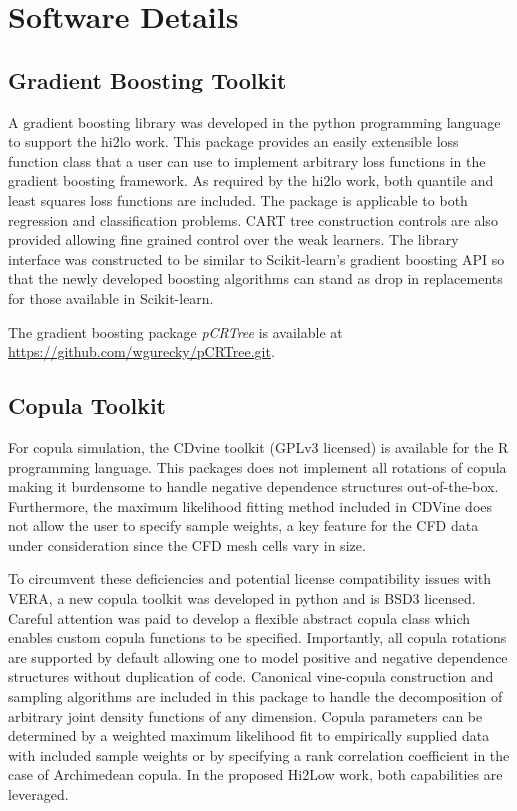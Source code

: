 
\section{Software Details}

\subsection{Gradient Boosting Toolkit}

A gradient boosting library was developed in the python programming language to support the hi2lo work.  This package provides an easily extensible loss function class that a user can use to implement arbitrary loss functions in the gradient boosting framework.  As required by the hi2lo work, both quantile and least squares loss functions are included.  The package is applicable to both regression and classification problems.  CART tree construction controls are also provided allowing fine grained control over the weak learners.
The library interface was constructed to be similar to Scikit-learn's gradient boosting API so that the newly developed boosting algorithms can stand as drop in replacements for those available in Scikit-learn.

The gradient boosting package \emph{pCRTree} is available at \url{https://github.com/wgurecky/pCRTree.git}.

\subsection{Copula Toolkit}

For copula simulation, the CDvine toolkit (GPLv3 licensed) is available for the R programming language. This packages does not implement all rotations of copula making it burdensome to handle negative dependence structures out-of-the-box.  Furthermore, the maximum likelihood fitting method included in CDVine does not allow the user to specify sample weights, a key feature for the CFD data under consideration since the CFD mesh cells vary in size.

To circumvent these deficiencies and potential license compatibility issues with VERA, a new copula toolkit was developed in python and is BSD3 licensed.
Careful attention was paid to develop a flexible abstract copula class which enables custom copula functions to be specified.  Importantly, all copula rotations are supported by default allowing one to model positive and negative dependence structures without duplication of code.
Canonical vine-copula construction and sampling algorithms are included in this package to handle the decomposition of arbitrary joint density functions of any dimension.
Copula parameters can be determined by a weighted maximum likelihood fit to empirically supplied data with included sample weights or by specifying a rank correlation coefficient in the case of Archimedean copula.  In the proposed Hi2Low work, both capabilities are leveraged.

